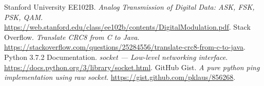 \documentclass[11pt, conference]{IEEEtran}
\begin{document}
\clearpage

\begin{thebibliography}{1}
 Stanford University EE102B. \emph{Analog Transmission of Digital Data: ASK, FSK, PSK, QAM}. \url{https://web.stanford.edu/class/ee102b/contents/DigitalModulation.pdf}.
 Stack Overflow. \emph{Translate CRC8 from C to Java}. \url{https://stackoverflow.com/questions/25284556/translate-crc8-from-c-to-java}.
 Python 3.7.2 Documentation. \emph{\textsf{socket} --- Low-level networking interface}. \url{https://docs.python.org/3/library/socket.html}.
 GitHub Gist. \emph{A pure python ping implementation using raw socket}. \url{https://gist.github.com/pklaus/856268}.
\end{thebibliography}
\end{document}
